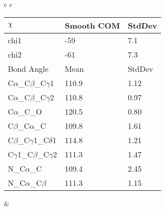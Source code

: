 \begin{longtable}{ c c }
\begin{tabular}{ l l l }
  $\chi$       & Smooth COM & StdDev \\ \midrule
  chi1 & -59 & 7.1 \\ 
  chi2 & -61 & 7.3 \\ \midrule
  Bond Angle   & Mean     & StdDev \\ \midrule
  C$\alpha$\_C$\beta$\_C$\gamma$1 & 110.9 & 1.12\\
  C$\alpha$\_C$\beta$\_C$\gamma$2 & 110.8 & 0.97\\
  C$\alpha$\_C\_O & 120.5 & 0.80\\
  C$\beta$\_C$\alpha$\_C & 109.8 & 1.61\\
  C$\beta$\_C$\gamma$1\_C$\delta$1 & 114.8 & 1.21\\
  C$\gamma$1\_C$\beta$\_C$\gamma$2 & 111.3 & 1.47\\
  N\_C$\alpha$\_C & 109.4 & 2.45\\
  N\_C$\alpha$\_C$\beta$ & 111.3 & 1.15\\
  \bottomrule
  \end{tabular}
  &
  \\
  
\end{longtable}

\newpage

